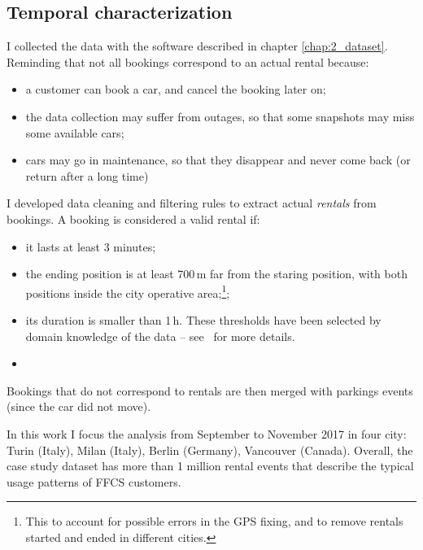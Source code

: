 \subsection{Temporal characterization}
I collected the data with the software described in chapter \ref{chap:2_dataset}. Reminding that not all bookings correspond to an actual rental because:
\begin{itemize}
	\item a customer can book a car, and cancel the booking later on;
	\item the data collection may suffer from outages, so that some snapshots may miss some available cars;
	\item cars may go in maintenance, so that they disappear and never come back (or return after a long time)
\end{itemize}
I developed data cleaning and filtering rules to extract actual \textit{rentals} from bookings. A booking is considered a valid rental if:
\begin{itemize}
	\item it lasts at least 3 minutes;
	\item the ending position is at least 700\,m far from the staring position, with both positions inside the city operative area;\footnote{This to account for possible errors in the GPS fixing, and to remove rentals started and ended in different cities.};
	\item its duration is smaller than 1\,h. These thresholds have been selected by domain knowledge of the data -- see~\cite{ciociolaumap} for more details.
	\item {}
\end{itemize}
Bookings that do not correspond to rentals are then merged with parkings events (since the car did not move).


In this work I focus the analysis from September to November 2017 in four city: Turin (Italy), Milan (Italy), Berlin (Germany), Vancouver (Canada).
Overall, the case study dataset has more than 1 million rental events that describe the typical usage patterns of FFCS customers. 


